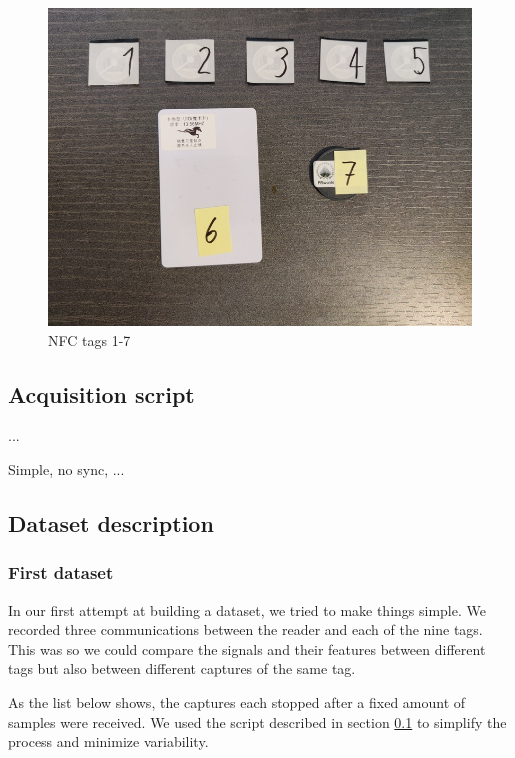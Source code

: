 \begin{figure}[htp!]
  \centering
  \includegraphics[scale=0.35]{figures/data_standard-tags2.jpg}
  \caption{NFC tags 1-7}
  \label{fig:tags}
\end{figure}

\subsection{Acquisition script} \label{script}

...

Simple, no sync, ...

\subsection{Dataset description}

\subsubsection{First dataset}

In our first attempt at building a dataset, we tried to make things simple. We recorded three communications between the reader and each of the nine tags. This was so we could compare the signals and their features between different tags but also between different captures of the same tag.

As the list below shows, the captures each stopped after a fixed amount of samples were received. We used the script described in section \ref{script} to simplify the process and minimize variability.

